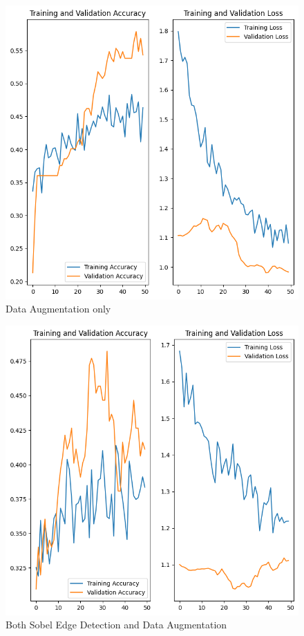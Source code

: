 \begin{figure}[H]
  \includegraphics[width=\linewidth]{figures/with_data_aug.png}
  \caption{Data Augmentation only}
  \label{fig:data_aug_plots}
\end{figure}

\begin{figure}[H]
  \includegraphics[width=\linewidth]{figures/with_data_aug_and_sobel_edge.png}
  \caption{Both Sobel Edge Detection and Data Augmentation}
  \label{fig:sobel_edge_and_data_aug_plots}
\end{figure}

